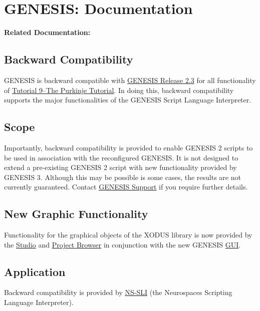 \documentclass[12pt]{article}
\begin{document}
\section*{GENESIS: Documentation}

{\bf Related Documentation:}

\subsection*{Backward Compatibility}

GENESIS is backward compatible with \href{http://genesis-sim.org/GENESIS/genesis-ftp/}{GENESIS Release 2.3} for all functionality of \href{http://genesis-sim.org/GENESIS/illtuts/purkinje.html}{Tutorial 9--The Purkinje Tutorial}. In doing this, backward compatibility supports the major functionalities of the GENESIS Script Language Interpreter.

\subsection*{Scope}

Importantly, backward compatibility is provided to enable GENESIS 2 scripts to be used in association with the reconfigured GENESIS. It is not designed to extend a pre-existing GENESIS 2 script with new functionality provided by GENESIS 3. Although this may be possible is some cases, the results are not currently guaranteed. Contact \href{http://genesis-sim.org/contact}{GENESIS Support} if you require further details.

\subsection*{New Graphic Functionality}

Functionality for the graphical objects of the XODUS library is now provided by the \href{../studio/studio.tex}{Studio} and \href{../project-browser/project-browser.tex}{Project Browser} in conjunction with the new GENESIS \href{../gui/gui.tex}{GUI}.

\subsection*{Application}

Backward compatibility is provided by \href{../nssli/nssli.tex}{NS-SLI} (the Neurospaces Scripting Language Interpreter).
\end{document}
